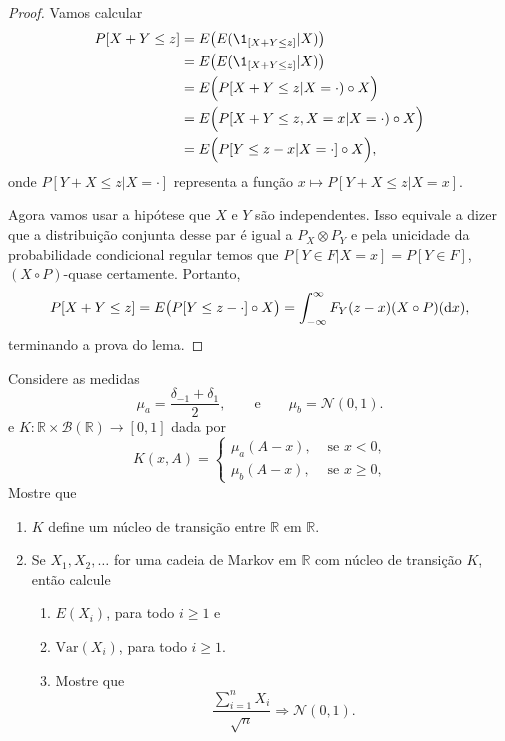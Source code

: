 \begin{proof}
  Vamos calcular
  \begin{equation}
    \begin{split}
      P[X + Y \leq z] & = E\big( E(\1_{[X + Y \leq z]} | X) \big)\\
      & = E\big( E(\1_{[X + Y \leq z]} | X) \big)\\
      & = E\Big( P[X + Y \leq z| X = \cdot) \circ X \Big)\\
      & = E\Big( P[X + Y \leq z, X = x| X = \cdot) \circ X \Big)\\
      & = E\Big( P[Y \leq z - x| X = \cdot] \circ X \Big),
    \end{split}
  \end{equation}
  onde $P[Y + X \leq z| X = \cdot]$ representa a função $x \mapsto P[Y + X \leq z | X = x]$.

  Agora vamos usar a hipótese que $X$ e $Y$ são independentes.
  Isso equivale a dizer que a distribuição conjunta desse par é igual a $P_X \otimes P_Y$ e pela unicidade da probabilidade condicional regular temos que $P[Y \in F | X = x] = P[Y \in F]$, $(X \circ P)$-quase certamente.
  Portanto,
  \begin{equation}
    P[X + Y \leq z] = E\big( P[Y \leq z - \cdot] \circ X \big) = \int_{-\infty}^\infty F_Y(z - x) (X \circ P) (\mathop{}\!\mathrm{d} x),
  \end{equation}
  terminando a prova do lema.
\end{proof}


\begin{exercise}
  Considere as medidas
  \begin{equation}
    \mu_a = \frac{\delta_{-1} + \delta_1}{2}, \qquad \text{e} \qquad \mu_b = \mathcal{N}(0, 1).
  \end{equation}
  e $K:\mathbb{R} \times \mathcal{B}(\mathbb{R}) \to [0,1]$ dada por
  \begin{equation}
    K(x, A) =
    \begin{cases}
      \mu_a (A - x), & \text{ se $x < 0$,}\\
      \mu_b (A - x), & \text{ se $x \geq 0$,}
    \end{cases}
  \end{equation}
  Mostre que
  \begin{enumerate}[\quad a)]
  \item $K$ define um núcleo de transição entre $\mathbb{R}$ em $\mathbb{R}$.
  \item Se $X_1, X_2, \dots$ for uma cadeia de Markov em $\mathbb{R}$ com núcleo de transição $K$, então calcule
    \begin{enumerate}[\qquad i)]
    \item $E(X_i)$, para todo $i \geq 1$ e
    \item $\text{Var}(X_i)$, para todo $i \geq 1$.
    \item Mostre que
      \begin{equation}
        \frac{\sum_{i = 1}^n X_i}{\sqrt{n}} \Rightarrow \mathcal{N}(0,1).
      \end{equation}
    \end{enumerate}
  \end{enumerate}
\end{exercise}


